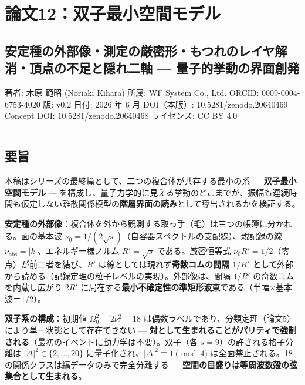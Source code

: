 \documentclass[
]{ltjsarticle}
\author{}
\date{}
\begin{document}
\section{論文12：双子最小空間モデル}\label{ux8ad6ux658712ux53ccux5b50ux6700ux5c0fux7a7aux9593ux30e2ux30c7ux30eb}

\subsection{安定種の外部像・測定の厳密形・もつれのレイヤ解消・頂点の不足と隠れ二軸
---
量子的挙動の界面創発}\label{ux5b89ux5b9aux7a2eux306eux5916ux90e8ux50cfux6e2cux5b9aux306eux53b3ux5bc6ux5f62ux3082ux3064ux308cux306eux30ecux30a4ux30e4ux89e3ux6d88ux9802ux70b9ux306eux4e0dux8db3ux3068ux96a0ux308cux4e8cux8ef8-ux91cfux5b50ux7684ux6319ux52d5ux306eux754cux9762ux5275ux767a}

著者: 木原 範昭 (Noriaki Kihara) 所属: WF System Co., Ltd. ORCID:
0009-0004-6753-4020 版: v0.2 日付: 2026 年 6 月 DOI（本版）: 10.5281/zenodo.20640469
Concept DOI: 10.5281/zenodo.20640468 ライセンス: CC BY 4.0

\begin{center}\rule{0.5\linewidth}{0.5pt}\end{center}

\subsection{要旨}\label{ux8981ux65e8}

本稿はシリーズの最終篇として、二つの複合体が共存する最小の系 ---
\textbf{双子最小空間モデル} ---
を構成し、量子力学的に見える挙動のどこまでが、振幅も連続時間も仮定しない離散関係模型の\textbf{階層界面の読み}として導出されるかを検証する。

\textbf{安定種の外部像}：複合体を外から観測する取っ手（毛）は三つの帳簿に分かれる。面の基本波
\(\nu_0=1/(2\sqrt s)\)（自容器スペクトルの支配線）、親記録の線
\(\nu_{\mathrm{obs}}=|k|\)、エネルギー様ノルム \(R'=\sqrt s\)
である。厳密恒等式 \(\nu_0 R'=1/2\)（零点）が前二者を結び、\(R'\)
は線としては現れず\textbf{奇数コムの間隔 \(1/R'\)
として}外部から読める（記録定理の粒子レベルの実現）。外部像は、間隔
\(1/R'\) の奇数コムを内蔵し広がり \(2R'\)
に局在する\textbf{最小不確定性の準矩形波束}である（半幅×基本波＝\(1/2\)）。

\textbf{双子系の構成}：初期値 \(\Omega_0^2=2\nu_1^2=18\)
は偶数ラベルであり、分類定理（論文5）により単一状態として存在できない
---
\textbf{対として生まれることがパリティで強制される}（最初のイベントに動力学は不要）。双子（各
\(s=9\)）の許される格子分離は \(|\Delta|^2\in\{2,\ldots,20\}\)
に量子化され、\(|\Delta|^2\equiv1\pmod4\)
は全面禁止される。18の関係クラスは縞データのみで完全分離する ---
\textbf{空間の目盛りは等周波数殻の弦集合として生まれる}。
\end{document}
